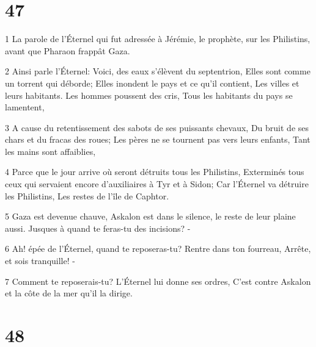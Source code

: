 \chapter{47}

\par 1 La parole de l'Éternel qui fut adressée à Jérémie, le prophète, sur les Philistins, avant que Pharaon frappât Gaza.
\par 2 Ainsi parle l'Éternel: Voici, des eaux s'élèvent du septentrion, Elles sont comme un torrent qui déborde; Elles inondent le pays et ce qu'il contient, Les villes et leurs habitants. Les hommes poussent des cris, Tous les habitants du pays se lamentent,
\par 3 A cause du retentissement des sabots de ses puissants chevaux, Du bruit de ses chars et du fracas des roues; Les pères ne se tournent pas vers leurs enfants, Tant les mains sont affaiblies,
\par 4 Parce que le jour arrive où seront détruits tous les Philistins, Exterminés tous ceux qui servaient encore d'auxiliaires à Tyr et à Sidon; Car l'Éternel va détruire les Philistins, Les restes de l'île de Caphtor.
\par 5 Gaza est devenue chauve, Askalon est dans le silence, le reste de leur plaine aussi. Jusques à quand te feras-tu des incisions? -
\par 6 Ah! épée de l'Éternel, quand te reposeras-tu? Rentre dans ton fourreau, Arrête, et sois tranquille! -
\par 7 Comment te reposerais-tu? L'Éternel lui donne ses ordres, C'est contre Askalon et la côte de la mer qu'il la dirige.

\chapter{48}

